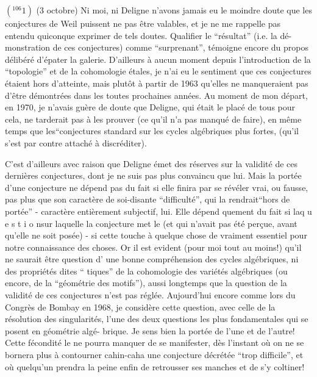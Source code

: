 $({}^{106}1)$ (3 octobre) Ni moi, ni Deligne n'avons jamais eu le moindre doute que les
conjectures de Weil puissent ne pas être valables, et je ne me rappelle pas 
entendu quiconque exprimer de tels doutes. Qualifier le ``résultat'' (i.e. la dé-\newline
monstration de ces conjectures) comme ``surprenant'', témoigne encore du propos
délibéré d'épater la galerie. D'ailleurs à aucun moment depuis l'introduction
de la ``topologie'' et de la cohomologie étales, je n'ai eu le sentiment que ces
conjectures étaient hors d'atteinte, mais plutôt \inserted{(}à partir de 1963\inserted{)} qu'elles ne
manqueraient pas d'être démontrées dans les toutes prochaines années. Au moment
de mon départ, en 1970, je n'avais guère de doute que Deligne, qui était le 
placé de tous pour cela, ne tarderait pas à les prouver (ce qu'il n'a pas manqué
de faire), en même temps que les``conjectures standard sur les cycles algébriques
plus fortes, (qu'il s'est par contre attaché à discréditer).

C'est d'ailleurs avec raison que Deligne émet des réserves sur la validité
de ces dernières conjectures, dont je ne suis pas plus convaincu que lui. Mais
la portée d'une conjecture ne dépend pas du fait si elle finira par se révéler
vrai, ou fausse, pas plus que son caractère de soi-disante ``difficulté'', qui la
rendrait``hors de portée'' - caractère entièrement subjectif, lui. Elle dépend \newline
quement du fait si la\quad q u e s t i o n\quad sur laquelle la conjecture met le 
(et qui n'avait pas été perçue, avant qu'elle ne soit posée) - si cette 
touche à quelque chose de vraiment essentiel pour notre connaissance des choses.
Or il est evident (pour moi tout au moins!) qu'il ne saurait être question d'
une bonne compréhension des cycles algébriques, ni des propriétés dites ``\newline
tiques'' de la cohomologie des variétés algébriques (ou encore, de la ``géométrie
des motifs''), aussi longtemps que la question de la validité de ces conjectures
n'est pas réglée. Aujourd'hui encore comme lors du Congrès de Bombay en 1968,
je considère cette question, avec celle de la résolution des singularités, 
l'une des deux questions les plus fondamentales qui se posent en géométrie algé-\newline
brique. Je sens bien la portée de l'une et de l'autre! Cette fécondité \newline
le ne pourra manquer de se manifester, dès l'instant où on ne se bornera plus à
contourner cahin-caha une conjecture décrétée ``trop difficile'', et où quelqu'un
prendra la peine enfin de retrousser ses manches et de s'y coltiner!

